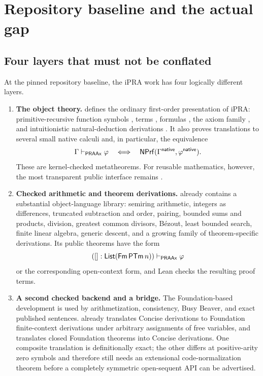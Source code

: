 
\section{Repository baseline and the actual gap}
\label{sec:audit}

\subsection{Four layers that must not be conflated}

At the pinned repository baseline, the iPRA work has four logically different
layers.

\begin{enumerate}
\item
\textbf{The object theory.}
 defines the ordinary first-order presentation of iPRA:
primitive-recursive function symbols , terms , formulas
, the axiom family , and intuitionistic natural-deduction
derivations .  It also proves translations to several small native
calculi and, in particular, the equivalence
\[
  \Gamma\vdash_{\mathsf{PRAAx}}\varphi
  \quad\Longleftrightarrow\quad
  \mathsf{NPrf}(\Gamma^{\mathsf{native}},\varphi^{\mathsf{native}}).
\]
These are kernel-checked metatheorems.  For reusable mathematics, however, the
most transparent public interface remains .

\item
\textbf{Checked arithmetic and theorem derivations.}
 already contains a substantial object-language library:
semiring arithmetic, integers as differences, truncated subtraction and order,
pairing, bounded sums and products, division, greatest common divisors,
B\'ezout, least bounded search, finite linear algebra, generic descent, and a
growing family of theorem-specific derivations.  Its public theorems have the
form
\[
       ([]:\mathsf{List}(\mathsf{Fm}\,\mathsf{PTm}\,n))\vdash_{\mathsf{PRAAx}}\varphi
\]
or the corresponding open-context form, and Lean checks the resulting proof
terms.

\item
\textbf{A second checked backend and a bridge.}
The Foundation-based development is used by arithmetization, consistency,
Busy Beaver, and exact published sentences.   already
translates Concise derivations to Foundation finite-context derivations under
arbitrary assignments of free variables, and translates closed Foundation
theorems into Concise derivations.  One composite translation is definitionally
exact; the other differs at positive-arity zero symbols and therefore still
needs an extensional code-normalization theorem before a completely symmetric
open-sequent API can be advertised.


\end{enumerate}
